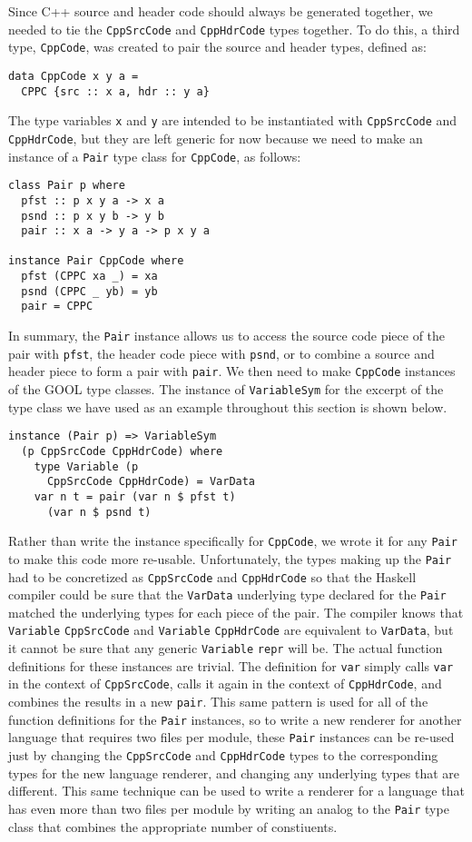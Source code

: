 \documentclass[sigplan,review,anonymous,prologue,dvipsnames]{acmart}
\begin{document}
Since C++ source and header code should always be generated together, we needed 
to tie the \verb|CppSrcCode| and \verb|CppHdrCode| types together. To do this, 
a third type, \verb|CppCode|, was created to pair the source and header types, 
defined as:
\begin{lstlisting}
data CppCode x y a = 
  CPPC {src :: x a, hdr :: y a}
\end{lstlisting}
The type variables \verb|x| and \verb|y| are intended to be instantiated with 
\verb|CppSrcCode| and \verb|CppHdrCode|, but they are left generic for now 
because we need to make an instance of a \verb|Pair| type class for 
\verb|CppCode|, as follows:
\begin{lstlisting}
class Pair p where
  pfst :: p x y a -> x a
  psnd :: p x y b -> y b
  pair :: x a -> y a -> p x y a
  
instance Pair CppCode where
  pfst (CPPC xa _) = xa
  psnd (CPPC _ yb) = yb
  pair = CPPC
\end{lstlisting}
In summary, the \verb|Pair| instance allows us to access the source code piece 
of the pair with \verb|pfst|, the header code piece with \verb|psnd|, or to 
combine a source and header piece to form a pair with \verb|pair|. We then need 
to make \verb|CppCode| instances of the GOOL type classes. The instance of 
\verb|VariableSym| for the excerpt of the type class we have used as an example 
throughout this section is shown below.
\begin{lstlisting}
instance (Pair p) => VariableSym 
  (p CppSrcCode CppHdrCode) where
    type Variable (p 
      CppSrcCode CppHdrCode) = VarData
    var n t = pair (var n $ pfst t) 
      (var n $ psnd t)
\end{lstlisting}
Rather than write the instance specifically for \verb|CppCode|, we wrote it for 
any \verb|Pair| to make this code more re-usable. Unfortunately, the types 
making up the \verb|Pair| had to be concretized as \verb|CppSrcCode| and 
\verb|CppHdrCode| so that the Haskell compiler could be sure that the 
\verb|VarData| underlying type declared for the \verb|Pair| matched the 
underlying types for each piece of the pair. The compiler knows that 
\verb|Variable| \verb|CppSrcCode| and \verb|Variable| \verb|CppHdrCode| are 
equivalent to \verb|VarData|, but it cannot be sure that any generic 
\verb|Variable| \verb|repr| will be. The actual function definitions for these 
instances are trivial. The definition for \verb|var| simply calls \verb|var| in 
the context of \verb|CppSrcCode|, calls it again in the context of 
\verb|CppHdrCode|, and combines the results in a new \verb|pair|. This same 
pattern is used for all of the function definitions for the \verb|Pair| 
instances, so to write a new renderer for another language that requires two 
files per module, these \verb|Pair| instances can be re-used just by changing 
the \verb|CppSrcCode| and \verb|CppHdrCode| types to the corresponding types 
for the new language renderer, and changing any underlying types that are 
different. This same technique can be used to write a renderer for a language 
that has even more than two files per module by writing an analog to the 
\verb|Pair| type class that combines the appropriate number of constiuents.
\end{document}
